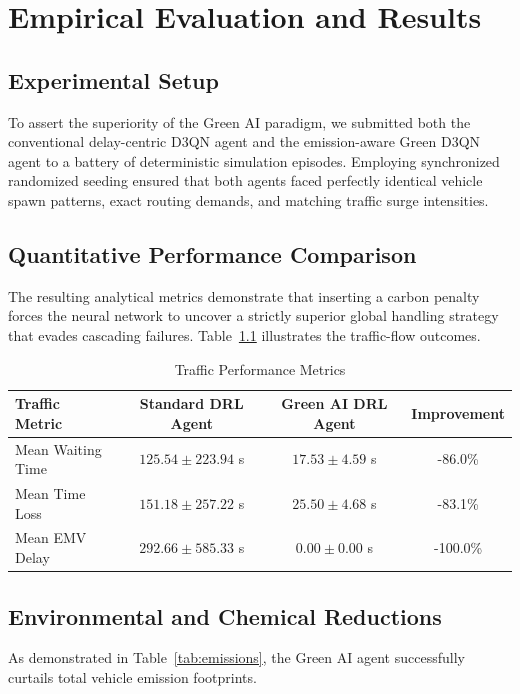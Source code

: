 \chapter{Empirical Evaluation and Results}
\label{chap:experiments}

\section{Experimental Setup}
To assert the superiority of the Green AI paradigm, we submitted both the conventional delay-centric D3QN agent and the emission-aware Green D3QN agent to a battery of deterministic simulation episodes. Employing synchronized randomized seeding ensured that both agents faced perfectly identical vehicle spawn patterns, exact routing demands, and matching traffic surge intensities.

\section{Quantitative Performance Comparison}
The resulting analytical metrics demonstrate that inserting a carbon penalty forces the neural network to uncover a strictly superior global handling strategy that evades cascading failures. Table~\ref{tab:traffic_metrics} illustrates the traffic-flow outcomes.

\begin{table}[h]
\centering
\caption{Traffic Performance Metrics}
\label{tab:traffic_metrics}
\renewcommand{\arraystretch}{1.2}
\begin{tabular}{|l|c|c|c|}
\hline
\textbf{Traffic Metric} & \textbf{Standard DRL Agent} & \textbf{Green AI DRL Agent} & \textbf{Improvement} \\
\hline
Mean Waiting Time & $125.54 \pm 223.94$ s & $17.53 \pm 4.59$ s & -86.0\% \\
Mean Time Loss & $151.18 \pm 257.22$ s & $25.50 \pm 4.68$ s & -83.1\% \\
Mean EMV Delay & $292.66 \pm 585.33$ s & $0.00 \pm 0.00$ s & -100.0\% \\
\hline
\end{tabular}
\end{table}

\section{Environmental and Chemical Reductions}
As demonstrated in Table~\ref{tab:emissions}, the Green AI agent successfully curtails total vehicle emission footprints.

